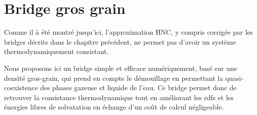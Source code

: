\chapter{Bridge gros grain}
\label{chap:bridge}




Comme il à été montré jusqu'ici, l'approximation HNC, y compris corrigée par les bridges décrits dans le chapitre précédent, ne permet pas d'avoir un système thermodynamiquement consistant. 


Nous proposons ici un bridge simple et efficace numériquement, basé sur une densité gros-grain, qui prend en compte le démouillage en permettant la quasi-coexistence des phases gazeuse et liquide de l'eau.
Ce bridge permet donc de retrouver la consistance thermodynamique tout en améliorant les rdfs et les énergies libres de solvatation en échange d'un coût de calcul négligeable.





